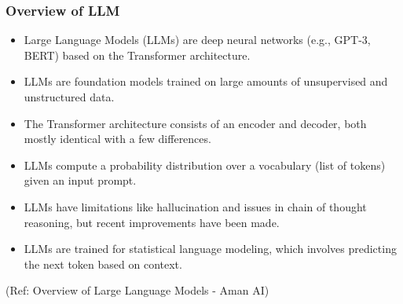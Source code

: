 \begin{frame}[fragile]\frametitle{Overview of LLM}


\begin{itemize}
\item Large Language Models (LLMs) are deep neural networks (e.g., GPT-3, BERT) based on the Transformer architecture.
\item LLMs are foundation models trained on large amounts of unsupervised and unstructured data.
\item The Transformer architecture consists of an encoder and decoder, both mostly identical with a few differences.
\item LLMs compute a probability distribution over a vocabulary (list of tokens) given an input prompt.
\item LLMs have limitations like hallucination and issues in chain of thought reasoning, but recent improvements have been made.
\item LLMs are trained for statistical language modeling, which involves predicting the next token based on context.
\end{itemize}

				
{\tiny (Ref: Overview of Large Language Models - Aman AI)}

\end{frame}

